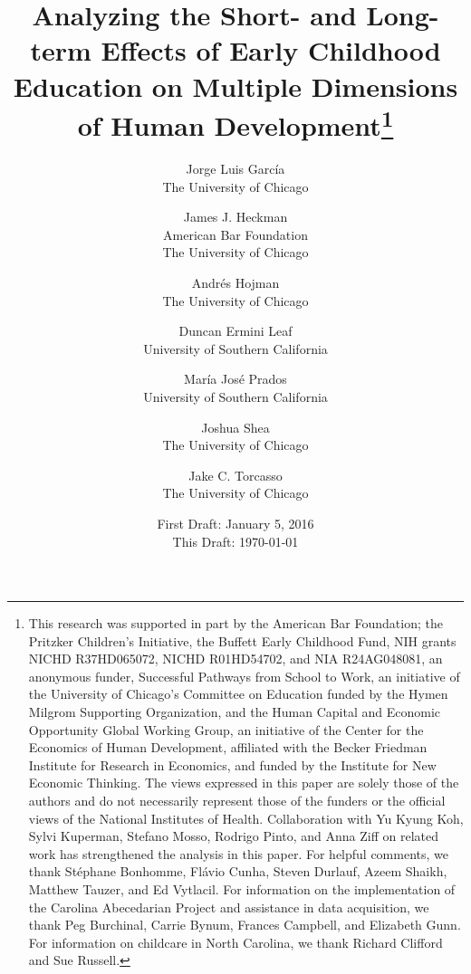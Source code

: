 






\title{\Large \textbf{Analyzing the Short- and Long-term Effects of Early Childhood Education on Multiple Dimensions of Human Development}\thanks{This research was supported in part by the American Bar Foundation; the Pritzker Children's Initiative, the
Buffett Early Childhood Fund, NIH grants NICHD R37HD065072, NICHD R01HD54702, and NIA R24AG048081, an
anonymous funder, Successful Pathways from School to Work, an initiative of the University of Chicago's Committee
on Education funded by the Hymen Milgrom Supporting Organization, and the Human Capital and Economic
Opportunity Global Working Group, an initiative of the Center for the Economics of Human Development, affiliated with
the Becker Friedman Institute for Research in Economics, and funded by the Institute for New Economic Thinking. The
views expressed in this paper are solely those of the authors and do not necessarily represent those of the funders or
the official views of the National Institutes of Health. Collaboration with Yu Kyung Koh, Sylvi Kuperman, Stefano Mosso, Rodrigo Pinto, and Anna Ziff on related work has strengthened the analysis in this paper. For helpful comments, we thank St\'{e}phane Bonhomme, Fl\'{a}vio Cunha, Steven Durlauf, Azeem Shaikh, Matthew Tauzer, and Ed Vytlacil. For information on the implementation of the Carolina Abecedarian Project and assistance in data acquisition, we thank Peg Burchinal, Carrie Bynum, Frances Campbell, and Elizabeth Gunn. For information on childcare in North Carolina, we thank Richard Clifford and Sue Russell.}}

\author{
Jorge Luis Garc\'{i}a\\
The University of Chicago \and
James J. Heckman \\
American Bar Foundation \\
The University of Chicago \and
Andr\'{e}s Hojman\\
The University of Chicago \and
Duncan Ermini Leaf \\ 
University of Southern California \and
Mar\'{i}a Jos\'{e} Prados \\
University of Southern California \and
Joshua Shea \\
The University of Chicago \and 
Jake C. Torcasso\\
The University of Chicago}
\date{First Draft: January 5, 2016\\ This Draft: \today}
\maketitle
\thispagestyle{empty}

